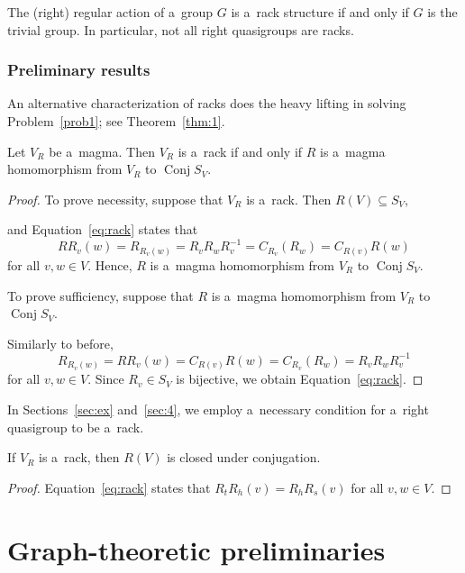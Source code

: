 \documentclass{jonasart}
\DeclareMathOperator{\Conj}{Conj}
\newcommand{\inv}{^{-1}}
\begin{document}
	\begin{example}
		The (right) regular action of a~group $G$ is a~rack structure if and only if $G$ is the trivial group. In particular, not all right quasigroups are racks.
	\end{example}

	\subsubsection{Preliminary results}
	
    An alternative characterization of racks does the heavy lifting in solving Problem~\ref{prob1}; see Theorem~\ref{thm:1}.
    
	\begin{proposition}\label{prop:sam}
		Let $V_R$ be a~magma. Then $V_R$ is a~rack if and only if $R$ is a~magma homomorphism from $V_R$ to $\Conj S_V$.
	\end{proposition}

	\begin{proof}
		To prove necessity, suppose that $V_R$ is a~rack. Then $R(V)\subseteq S_V$,

		and Equation~\eqref{eq:rack} states that
		\[
			    RR_v(w)
                =R_{R_v(w)}
                =R_vR_wR_v\inv
                = C_{R_v}(R_w)
                = C_{R(v)}R(w)
		\]
		for all $v,w\in V$. Hence, $R$ is a~magma homomorphism from $V_R$ to $\Conj S_V$.

		To prove sufficiency, suppose that $R$ is a~magma homomorphism from $V_R$ to $\Conj S_V$.

		Similarly to before,
		\[
            R_{R_v(w)}
            =RR_v(w)
            =C_{R(v)}R(w)
            = C_{R_v}(R_w)
            = R_vR_wR_v\inv
		\]
		for all $v,w\in V$. Since $R_v\in S_V$ is bijective, we obtain Equation~\eqref{eq:rack}.
	\end{proof}

	In Sections~\ref{sec:ex} and~\ref{sec:4}, we employ a~necessary condition for a~right quasigroup to be a~rack.

	\begin{lemma}\label{lemma:conj}
		If $V_R$ is a~rack, then $R(V)$ is closed under conjugation.
	\end{lemma}

	\begin{proof}
		Equation~\eqref{eq:rack} states that $R_t R_h (v)=R_h R_s (v)$ for all $v,w\in V$.
	\end{proof}

	\section{Graph-theoretic preliminaries}\label{sec:grph}
\end{document}
